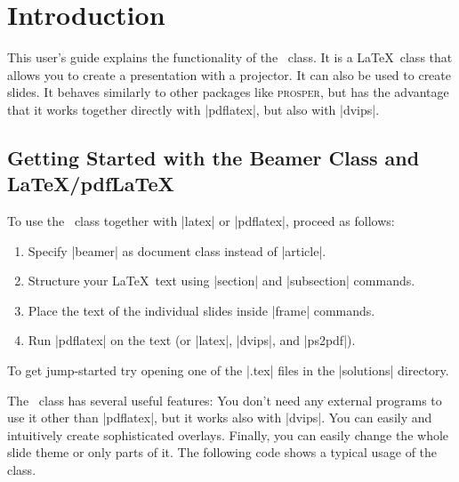 

%

\section{Introduction}

This user's guide explains the functionality of the \beamer\ class.
It is a \LaTeX\ class that allows you to create a presentation with a
projector. It can also be used to create slides. It behaves 
similarly to other packages like \textsc{prosper}, but has the
advantage that it works together directly with |pdflatex|, but
also with |dvips|.

\subsection{Getting Started with the Beamer Class and \LaTeX/pdf\LaTeX}

To use the \beamer\ class together with |latex| or |pdflatex|, proceed
as follows: 
\begin{enumerate}
\item
  Specify |beamer| as document class instead of
  |article|.
\item
  Structure your \LaTeX\ text using |section| and
  |subsection| commands.
\item
  Place the text of the individual slides inside |frame|
  commands.
\item
  Run |pdflatex| on the text (or |latex|,
  |dvips|, and |ps2pdf|).
\end{enumerate}

To get jump-started try opening one of the |.tex| files in the
|solutions| directory.

The \beamer\ class has several useful features: You don't need any
external programs to use it other than |pdflatex|, but it works
also with |dvips|. You can easily and intuitively create
sophisticated overlays. Finally, you can easily change the whole slide
theme or only parts of it. The following code shows a typical usage of
the class.


